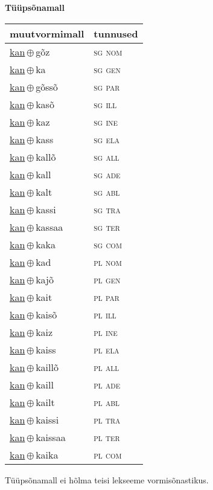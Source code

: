 

\vspace{3.5em}
\noindent \begin{minipage}{\textwidth}
\noindent \textbf{Tüüpsõnamall \,}\\

\begin{sideways}
\begin{tabular}{l l}
muutvormimall & tunnused \\
\hline
\underline{kan}\,$\oplus$\,gõz & \textsc{ sg nom } \\
\underline{kan}\,$\oplus$\,ka & \textsc{ sg gen } \\
\underline{kan}\,$\oplus$\,gõssõ & \textsc{ sg par } \\
\underline{kan}\,$\oplus$\,kasõ & \textsc{ sg ill } \\
\underline{kan}\,$\oplus$\,kaz & \textsc{ sg ine } \\
\underline{kan}\,$\oplus$\,kass & \textsc{ sg ela } \\
\underline{kan}\,$\oplus$\,kallõ & \textsc{ sg all } \\
\underline{kan}\,$\oplus$\,kall & \textsc{ sg ade } \\
\underline{kan}\,$\oplus$\,kalt & \textsc{ sg abl } \\
\underline{kan}\,$\oplus$\,kassi & \textsc{ sg tra } \\
\underline{kan}\,$\oplus$\,kassaa & \textsc{ sg ter } \\
\underline{kan}\,$\oplus$\,kaka & \textsc{ sg com } \\
\underline{kan}\,$\oplus$\,kad & \textsc{ pl nom } \\
\underline{kan}\,$\oplus$\,kajõ & \textsc{ pl gen } \\
\underline{kan}\,$\oplus$\,kait & \textsc{ pl par } \\
\underline{kan}\,$\oplus$\,kaisõ & \textsc{ pl ill } \\
\underline{kan}\,$\oplus$\,kaiz & \textsc{ pl ine } \\
\underline{kan}\,$\oplus$\,kaiss & \textsc{ pl ela } \\
\underline{kan}\,$\oplus$\,kaillõ & \textsc{ pl all } \\
\underline{kan}\,$\oplus$\,kaill & \textsc{ pl ade } \\
\underline{kan}\,$\oplus$\,kailt & \textsc{ pl abl } \\
\underline{kan}\,$\oplus$\,kaissi & \textsc{ pl tra } \\
\underline{kan}\,$\oplus$\,kaissaa & \textsc{ pl ter } \\
\underline{kan}\,$\oplus$\,kaika & \textsc{ pl com } \\
\end{tabular}
\end{sideways}
\label{tab:tüüpsõnamall-kangõz}

\end{minipage}

 
\vspace{1em}
\noindent Tüüpsõnamall  ei hõlma teisi lekseeme vormi\-sõnastikus.

